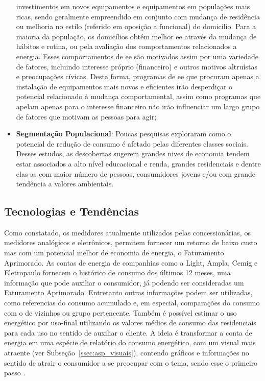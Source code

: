\begin{itemize}
investimentos em novos equipamentos e equipamentos em populações mais ricas, sendo
geralmente empreendido em conjunto com mudança de residência ou melhoria no
estilo (referido em oposição a funcional) do domicilio. Para a maioria da
população, os domicílios obtém melhor \gls{ee} através da mudança de hábitos e 
rotina, ou pela avaliação dos comportamentos relacionados a energia. Esses
comportamentos de \gls{ee} são motivados assim por uma variedade de fatores,
incluindo interesse próprio (financeiro) e outros motivos altruístas e
preocupações cívicas. Desta forma, programas de \gls{ee} que procuram apenas 
a instalação de equipamentos mais novos e eficientes irão 
desperdiçar o potencial relacionado à mudança comportamental, assim como
programas que apelam apenas para o interesse financeiro não irão influenciar um
largo grupo de fatores que motivam as pessoas para agir;
\item \textbf{Segmentação Populacional}: Poucas pesquisas exploraram como o
potencial de redução de consumo é afetado pelas diferentes classes sociais.
Desses estudos, as descobertas sugerem grandes nives de economia tendem estar
associados a alto nível educacional e renda, grandes residenciais e dentre elas
as com maior número de pessoas, consumidores jovens e/ou com grande tendência a
valores ambientais.
\end{itemize} 

\subsection{Tecnologias e Tendências}
\label{ssec:ret_tec}

Como constatado, os medidores atualmente utilizados pelas 
concessionárias, os medidores analógicos e eletrônicos, permitem fornecer um 
retorno de baixo custo mas com um potencial melhor de economia de energia, 
o Faturamento Aprimorado. As contas de energia de companhias como a Light,
Ampla, Cemig e Eletropaulo fornecem o histórico de consumo dos últimos 12 meses,
uma informação que pode auxiliar o consumidor, já podendo ser consideradas um 
Faturamento Aprimorado. Entretanto outras informações podem ser utilizadas, 
como referencias do consumo acumulado e, em especial, comparações do consumo 
com o de vizinhos ou grupo pertencente. Também é possível estimar o uso 
energético por uso-final utilizando os valores médios de consumo das residenciais
para cada uso no sentido de auxiliar o cliente. A ideia é
transformar a conta de energia em uma espécie de relatório do consumo energético,
com um visual mais atraente (ver Subseção~\ref{ssec:asp_visuais}), 
contendo gráficos e informações no sentido de atrair o consumidor a se 
preocupar com o tema, sendo esse o primeiro passo \cite{2009_epri}.

